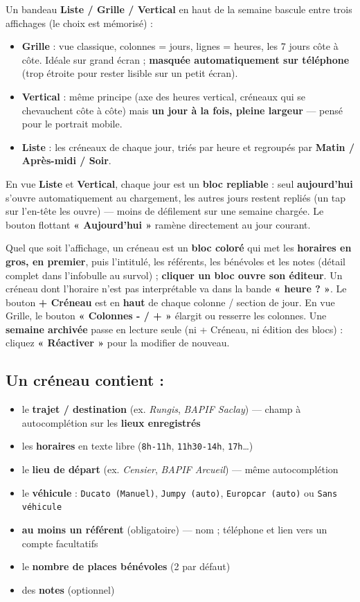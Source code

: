 \documentclass[11pt,a4paper]{article}
\begin{document}
Un bandeau \textbf{Liste / Grille / Vertical} en haut de la semaine bascule entre trois
affichages (le choix est mémorisé) :
\begin{itemize}
  \item \textbf{Grille} : vue classique, colonnes = jours, lignes = heures, les 7 jours côte à
  côte. Idéale sur grand écran ; \textbf{masquée automatiquement sur téléphone} (trop étroite
  pour rester lisible sur un petit écran).
  \item \textbf{Vertical} : même principe (axe des heures vertical, créneaux qui se
  chevauchent côte à côte) mais \textbf{un jour à la fois, pleine largeur} — pensé pour le
  portrait mobile.
  \item \textbf{Liste} : les créneaux de chaque jour, triés par heure et regroupés par
  \textbf{Matin / Après-midi / Soir}.
\end{itemize}

En vue \textbf{Liste} et \textbf{Vertical}, chaque jour est un \textbf{bloc repliable} : seul
\textbf{aujourd'hui} s'ouvre automatiquement au chargement, les autres jours restent repliés
(un tap sur l'en-tête les ouvre) — moins de défilement sur une semaine chargée. Le bouton
flottant \textbf{« Aujourd'hui »} ramène directement au jour courant.

Quel que soit l'affichage, un créneau est un \textbf{bloc coloré} qui met les \textbf{horaires
en gros, en premier}, puis l'intitulé, les référents, les bénévoles et les notes (détail complet
dans l'infobulle au survol) ; \textbf{cliquer un bloc ouvre son éditeur}. Un créneau dont
l'horaire n'est pas interprétable va dans la bande \textbf{« heure ? »}. Le bouton
\textbf{+ Créneau} est en \textbf{haut} de chaque colonne / section de jour. En vue Grille, le
bouton \textbf{« Colonnes - / + »} élargit ou resserre les colonnes. Une \textbf{semaine
archivée} passe en lecture seule (ni + Créneau, ni édition des blocs) : cliquez
\textbf{« Réactiver »} pour la modifier de nouveau.

\subsection*{Un créneau contient :}
\begin{itemize}
  \item le \textbf{trajet / destination} (ex. \emph{Rungis}, \emph{BAPIF Saclay}) — champ à
  autocomplétion sur les \textbf{lieux enregistrés}
  \item les \textbf{horaires} en texte libre (\texttt{8h-11h}, \texttt{11h30-14h}, \texttt{17h}…)
  \item le \textbf{lieu de départ} (ex. \emph{Censier}, \emph{BAPIF Arcueil}) — même
  autocomplétion
  \item le \textbf{véhicule} : \texttt{Ducato (Manuel)}, \texttt{Jumpy (auto)},
  \texttt{Europcar (auto)} ou \texttt{Sans véhicule}
  \item \textbf{au moins un référent} (obligatoire) — nom ; téléphone et lien vers un compte
  facultatifs
  \item le \textbf{nombre de places bénévoles} (2 par défaut)
  \item des \textbf{notes} (optionnel)
\end{itemize}
\end{document}
